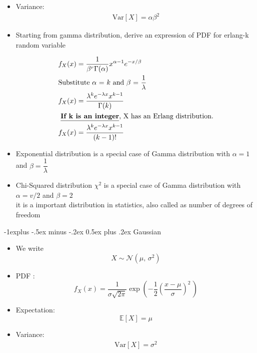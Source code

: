 \documentclass[10pt,landscape]{article}
\makeatletter
\renewcommand{\subsection}{\@startsection{subsection}{2}{0mm}%
                                {-1explus -.5ex minus -.2ex}%
                                {0.5ex plus .2ex}%
                                {\normalfont\normalsize\bfseries}}
\makeatother
\begin{document}
\begin{multicols*}{3}
\begin{itemize}
\item Variance:
\begin{align*}
\text{Var}[X] =\alpha \beta^2
\end{align*}


\item Starting from gamma distribution, derive an expression of PDF for erlang-k random variable

\begin{align*}
&f_X(x) = \frac{1}{\beta^r \Gamma (\alpha)} x^{\alpha - 1} e^{-x/\beta}\\
&\text{Substitute $\alpha$ = $k$ and $\beta$ = $\frac{1}{\lambda}$ }\\
 &f_X(x) = \frac{\lambda^k e ^{-\lambda x} x ^{k-1}}{\Gamma(k)}\\
& \text{ \underline{\textbf{If k is an integer}}, X has an Erlang distribution.}\\
& f_X(x) = \frac{\lambda^k e ^{-\lambda x} x ^{k-1}}{(k-1)!}
\end{align*}

\item Exponential distribution is a special case of Gamma distribution with $\alpha = 1$ and $\beta = \dfrac{1}{\lambda}$

\item Chi-Squared distribution $\chi^2$ is a special case of Gamma distribution with $\alpha = v/2$ and $\beta =2$ \\
it is a important distribution in statistics, also called as number of degrees of freedom
\end{itemize}




\subsection{Gaussian} 
\begin{itemize}
\item We write $$X \sim \mathcal{N}(\mu,\,\sigma^{2})$$

\item PDF :
$$f_X(x) = \frac{1}{\sigma\sqrt{2\pi}} 
  \exp\left( -\frac{1}{2}\left(\frac{x-\mu}{\sigma}\right)^{\!2}\,\right)
$$


\item Expectation:
$$ \mathbb{E}[X] = \mu $$

\item Variance:
\begin{align*}
\text{Var}[X] = \sigma^2
\end{align*}
\end{itemize}


\end{multicols*}
\end{document}
